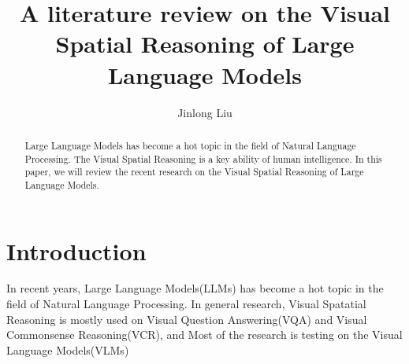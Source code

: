 \documentclass[journal,]{IEEEtran}
\title{A literature review on the Visual Spatial Reasoning of Large Language Models}
\begin{document}
\maketitle
\author{Jinlong Liu}
\begin{abstract}
Large Language Models has become a hot topic in the field of Natural Language Processing. The Visual Spatial Reasoning is a key ability of human intelligence. In this paper, we will review the recent research on the Visual Spatial Reasoning of Large Language Models.
\end{abstract}
\section{Introduction}
In recent years, Large Language Models(LLMs) has become a hot topic in the field of Natural Language Processing. In general research, Visual Spatatial Reasoning is mostly used on Visual Question Answering(VQA) and Visual Commonsense Reasoning(VCR), and Most of the research is testing on the Visual Language Models(VLMs)
\end{document}
